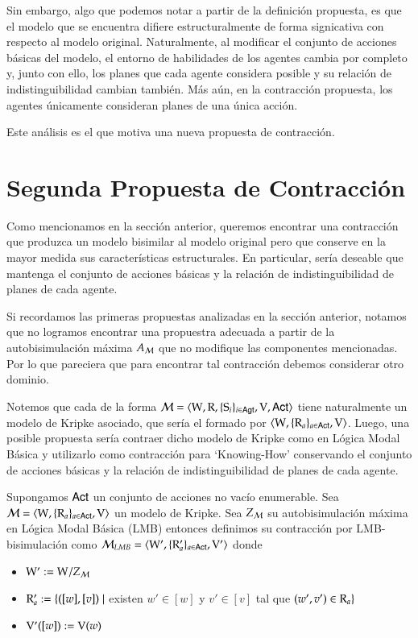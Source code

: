 Sin embargo, algo que podemos notar a partir de la definición propuesta, es que el modelo que se encuentra difiere estructuralmente de 
forma signicativa con respecto al modelo original. 
Naturalmente, al modificar el conjunto de acciones básicas del modelo, el entorno de habilidades de los agentes cambia por completo y, junto con ello, 
los planes que cada agente considera posible y su relación de indistinguibilidad cambian también. Más aún, en la contracción propuesta, los agentes 
únicamente consideran planes de una única acción.

Este análisis es el que motiva una nueva propuesta de contracción.

\section{Segunda Propuesta de Contracción}

Como mencionamos en la sección anterior, queremos encontrar una contracción que produzca un modelo bisimilar al modelo original pero que conserve 
en la mayor medida sus características estructurales. En particular, sería deseable que mantenga el conjunto de acciones básicas y la relación de 
indistinguibilidad de planes de cada agente.

Si recordamos las primeras propuestas analizadas en la sección anterior, notamos que no logramos encontrar una propuestra adecuada a partir de 
la autobisimulación máxima $A_{\mathcal{M}}$ que no modifique las componentes mencionadas. Por lo que pareciera que para encontrar tal contracción 
debemos considerar otro dominio.  

Notemos que cada \ults de la forma $\mathcal{M}=\langle \mathrm{W},\mathrm{R},\{ \mathrm{S}_i \}_{i \in {\rm \sf Agt}},\mathrm{V},{\rm \sf Act} \rangle$ tiene naturalmente un modelo de Kripke asociado, 
que sería el formado por $\langle \mathrm{W},\{\mathrm{R}_a\}_{a\in{\rm \sf Act}},\mathrm{V} \rangle$. Luego, una posible propuesta sería contraer dicho modelo de Kripke como en 
Lógica Modal Básica y utilizarlo como contracción para `Knowing-How' conservando el conjunto de acciones básicas y la relación de indistinguibilidad 
de planes de cada agente. 

\begin{definicion}
    Supongamos ${\rm \sf Act}$ un conjunto de acciones no vacío enumerable.
    Sea $\mathcal{M} = \langle \mathrm{W},\{\mathrm{R}_a\}_{a\in{\rm \sf Act}},\mathrm{V} \rangle$ un modelo de Kripke. Sea $Z_{\mathcal{M}}$ su autobisimulación máxima en Lógica Modal Básica (LMB) entonces definimos su contracción por LMB-bisimulación como $\mathcal{M}_{LMB} = \langle \mathrm{W}',\{\mathrm{R}'_a\}_{a\in{\rm \sf Act}},\mathrm{V}' \rangle$ donde
    \begin{center}
        \begin{itemize}
            \item $\mathrm{W}' := \mathrm{W} /Z_{\mathcal{M}}$
            \item $\mathrm{R}_a' := \{([w],[v]) \mid$ existen $w' \in [w]$ y $v' \in [v]$ tal que $(w',v') \in \mathrm{R}_a \}$
            \item $\mathrm{V}'([w]) := \mathrm{V}(w)$
        \end{itemize}
    \end{center} 
\end{definicion}

